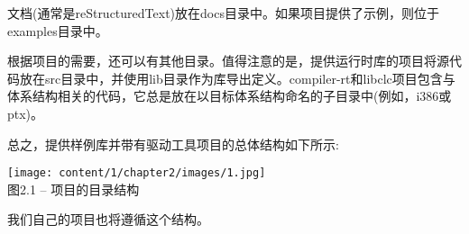 文档(通常是reStructuredText)放在docs目录中。如果项目提供了示例，则位于examples目录中。\par

根据项目的需要，还可以有其他目录。值得注意的是，提供运行时库的项目将源代码放在src目录中，并使用lib目录作为库导出定义。compiler-rt和libclc项目包含与体系结构相关的代码，它总是放在以目标体系结构命名的子目录中(例如，i386或ptx)。\par

总之，提供样例库并带有驱动工具项目的总体结构如下所示:\par

\hspace*{\fill} \par %
\begin{center}
\texttt{[image: content/1/chapter2/images/1.jpg]}\\
图2.1 – 项目的目录结构
\end{center}

我们自己的项目也将遵循这个结构。\par









